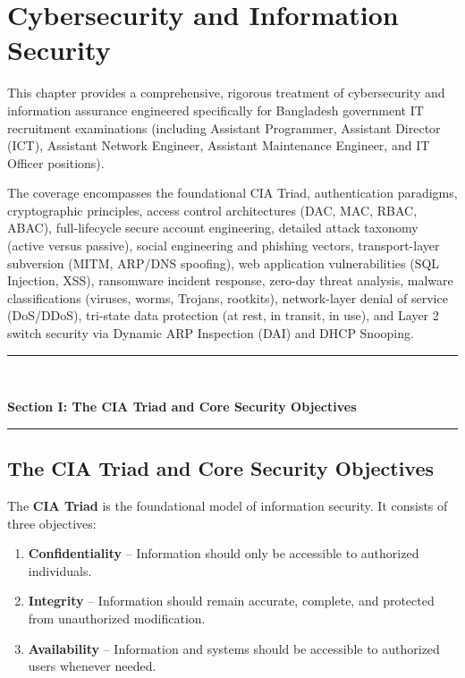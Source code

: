 \chapter{Cybersecurity and Information Security}
\label{ch:cybersecurity}

This chapter provides a comprehensive, rigorous treatment of cybersecurity and information assurance engineered specifically for Bangladesh government IT recruitment examinations (including Assistant Programmer, Assistant Director (ICT), Assistant Network Engineer, Assistant Maintenance Engineer, and IT Officer positions).

The coverage encompasses the foundational CIA Triad, authentication paradigms, cryptographic principles, access control architectures (DAC, MAC, RBAC, ABAC), full-lifecycle secure account engineering, detailed attack taxonomy (active versus passive), social engineering and phishing vectors, transport-layer subversion (MITM, ARP/DNS spoofing), web application vulnerabilities (SQL Injection, XSS), ransomware incident response, zero-day threat analysis, malware classifications (viruses, worms, Trojans, rootkits), network-layer denial of service (DoS/DDoS), tri-state data protection (at rest, in transit, in use), and Layer 2 switch security via Dynamic ARP Inspection (DAI) and DHCP Snooping.


\newpage
\begin{center}
\vspace{0.5em}
{\color{primary}\rule{0.45\textwidth}{1.2pt}\\[4pt]}
{\Large\bfseries\color{primary} Section I: The CIA Triad and Core Security Objectives\\[2pt]}
{\color{primary}\rule{0.45\textwidth}{1.2pt}}
\vspace{0.5em}
\end{center}

\section{The CIA Triad and Core Security Objectives}


The \textbf{CIA Triad} is the foundational model of information security. It consists of three objectives:

\begin{enumerate}
\item \textbf{Confidentiality} -- Information should only be accessible to authorized individuals.
\item \textbf{Integrity} -- Information should remain accurate, complete, and protected from unauthorized modification.
\item \textbf{Availability} -- Information and systems should be accessible to authorized users whenever needed.
\end{enumerate}

